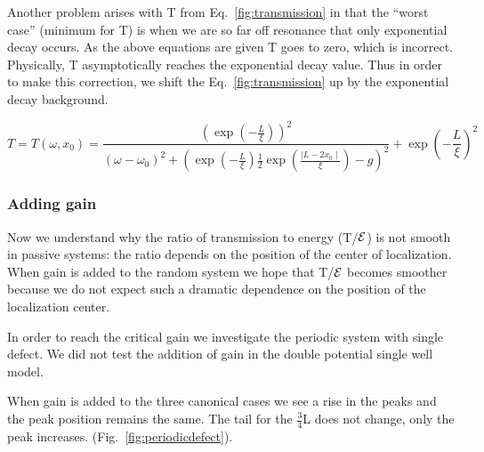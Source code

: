 Another problem arises with T from Eq.~\ref{fig:transmission} in 
that the ``worst case'' (minimum for T) is when we are so far off resonance
that only exponential decay occurs. As the above equations are given
T goes to zero, which is incorrect. Physically, T asymptotically reaches the exponential
decay value. Thus in order to make this correction, we shift the 
Eq.~\ref{fig:transmission} up by the exponential decay background.

\begin{equation}
T = T(\omega, x_0) = \frac{(\exp(-\frac{L}{\xi}))^2}{
(\omega-\omega _0)^2 + (\exp(-\frac{L}{\xi})\frac{1}{2}\exp(\frac{\mid L-2 x_0 \mid}{\xi})-g)^2
} + \exp\left(-\frac{L}{\xi}\right)^2
\label{fig:correctedtransmission}
\end{equation}

\subsubsection {Adding gain}

Now we understand why the ratio of transmission to energy (T/${\cal E}$) is not smooth in passive systems: the ratio depends on the position of the center of localization. When gain is added to the random system we hope that T/${\cal E}$ becomes smoother because we do not expect such a dramatic dependence on the position of the localization center.

In order to reach the critical gain we investigate the periodic system with single defect. We did not test the addition of gain in the double potential single well model.

When gain is added to the three canonical cases we see a rise in the peaks and the peak position remains the same. The tail for the $ \frac{3}{4} $L does not change, only the peak increases.  (Fig.~\ref{fig:periodicdefect}).

